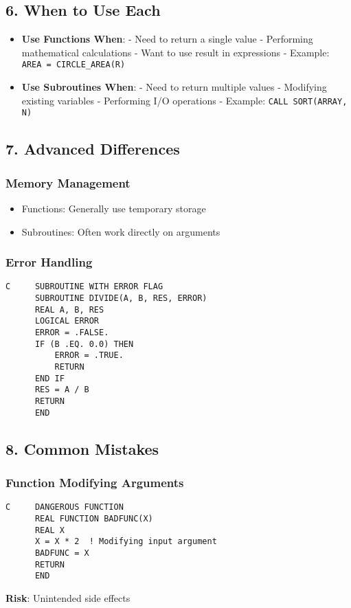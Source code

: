 \documentclass{book}
\begin{document}
\subsection*{6. When to Use Each}
\begin{itemize}
\item \textbf{Use Functions When}:
  - Need to return a single value
  - Performing mathematical calculations
  - Want to use result in expressions
  - Example: \texttt{AREA = CIRCLE\_AREA(R)}

\item \textbf{Use Subroutines When}:
  - Need to return multiple values
  - Modifying existing variables
  - Performing I/O operations
  - Example: \texttt{CALL SORT(ARRAY, N)}
\end{itemize}

\subsection*{7. Advanced Differences}
\subsubsection*{Memory Management}
\begin{itemize}
\item Functions: Generally use temporary storage
\item Subroutines: Often work directly on arguments
\end{itemize}

\subsubsection*{Error Handling}
\begin{verbatim}
C     SUBROUTINE WITH ERROR FLAG
      SUBROUTINE DIVIDE(A, B, RES, ERROR)
      REAL A, B, RES
      LOGICAL ERROR
      ERROR = .FALSE.
      IF (B .EQ. 0.0) THEN
          ERROR = .TRUE.
          RETURN
      END IF
      RES = A / B
      RETURN
      END
\end{verbatim}

\subsection*{8. Common Mistakes}
\subsubsection*{Function Modifying Arguments}
\begin{verbatim}
C     DANGEROUS FUNCTION
      REAL FUNCTION BADFUNC(X)
      REAL X
      X = X * 2  ! Modifying input argument
      BADFUNC = X
      RETURN
      END
\end{verbatim}
\textbf{Risk}: Unintended side effects
\end{document}
